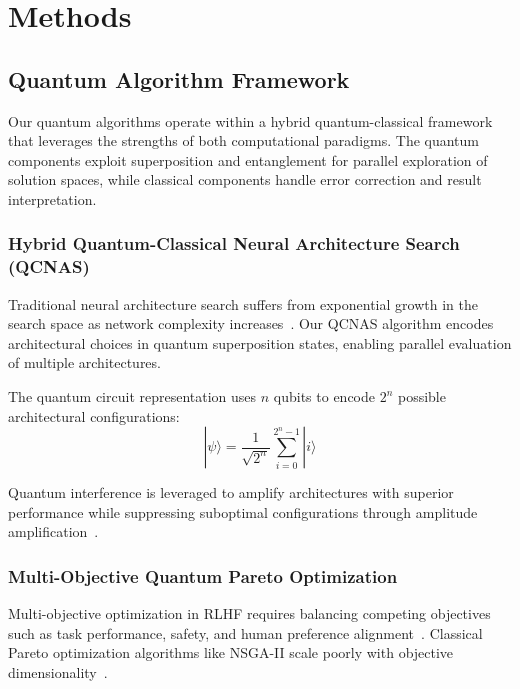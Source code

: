 \documentclass[fleqn,10pt]{wlscirep}
\begin{document}
\section{Methods}

\subsection{Quantum Algorithm Framework}

Our quantum algorithms operate within a hybrid quantum-classical framework that leverages the strengths of both computational paradigms. The quantum components exploit superposition and entanglement for parallel exploration of solution spaces, while classical components handle error correction and result interpretation.

\subsubsection{Hybrid Quantum-Classical Neural Architecture Search (QCNAS)}

Traditional neural architecture search suffers from exponential growth in the search space as network complexity increases~\cite{elsken2019neural,ren2021comprehensive}. Our QCNAS algorithm encodes architectural choices in quantum superposition states, enabling parallel evaluation of multiple architectures.

The quantum circuit representation uses $n$ qubits to encode $2^n$ possible architectural configurations:
\begin{equation}
|\psi\rangle = \frac{1}{\sqrt{2^n}} \sum_{i=0}^{2^n-1} |i\rangle
\end{equation}

Quantum interference is leveraged to amplify architectures with superior performance while suppressing suboptimal configurations through amplitude amplification~\cite{brassard2002quantum}.

\subsubsection{Multi-Objective Quantum Pareto Optimization}

Multi-objective optimization in RLHF requires balancing competing objectives such as task performance, safety, and human preference alignment~\cite{liu2023training,kenton2021alignment}. Classical Pareto optimization algorithms like NSGA-II scale poorly with objective dimensionality~\cite{deb2002fast,coello2007evolutionary}.
\end{document}
